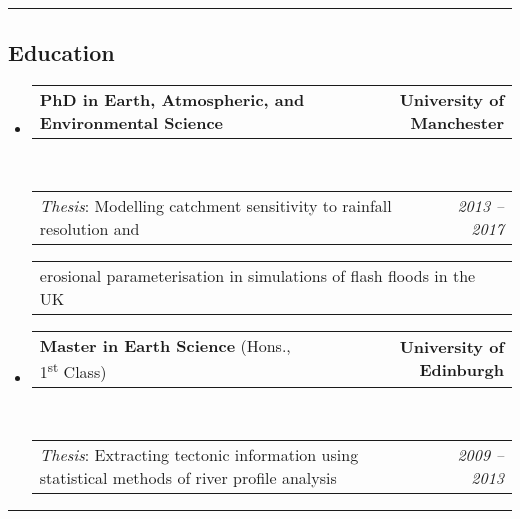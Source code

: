 \documentclass[10.5pt,a4]{article}
\makeatletter
\newcommand{\headerrow}[2]
{\begin{tabular*}{\linewidth}{l@{\extracolsep{\fill}}r}
	#1 &
	#2 \\
\end{tabular*}}
\makeatother
\begin{document}
\hrule
\vspace{-0.4em}
\subsection*{Education}
\begin{itemize}
	\parskip=0.1em
	
	\item 
	\headerrow
		{\textbf{PhD in Earth, Atmospheric, and Environmental Science}}
		{\textbf{University of Manchester}}
	\\
	\headerrow
		{\emph{Thesis}: Modelling catchment sensitivity to rainfall resolution and}
		{\emph{2013 -- 2017}}
	\headerrow
		{\hspace{10mm} erosional parameterisation in simulations of flash floods in the UK}
		{}
  
	\item 
	\headerrow
		{\textbf{Master in Earth Science} (Hons., 1\textsuperscript{st} Class) }
		{\textbf{University of Edinburgh}}
	\\
	\headerrow
		{\emph{Thesis}: Extracting tectonic information using statistical methods of river profile analysis}
		{\emph{2009 -- 2013}}
\end{itemize}

\hrule
\vspace{-0.4em}
\end{document}
